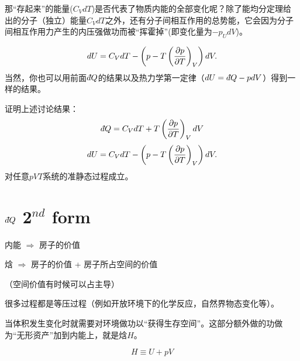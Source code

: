 \documentclass[CJK]{beamer}
\begin{document}
\begin{frame}
\bchL
那“存起来”的能量($C_VdT$)是否代表了物质内能的全部变化呢？除了能均分定理给出的分子（独立）能量$C_V dT$之外，还有分子间相互作用的总势能，它会因为分子间相互作用力产生的内压强做功而被“挥霍掉”(即变化量为$-p_U dV$)。

{\blue $$ dU = C_V dT - \left(p - T\left(\frac{\partial p}{\partial T}\right)_{V}\right) dV. $$}
当然，你也可以用前面$\dbar Q$的结果以及热力学第一定律（$dU = \dbar Q-pdV$）得到一样的结果。
\echL
\end{frame}



\begin{frame}
\bchL


证明上述讨论结果：
{\blue $$ \dbar Q = C_V dT + T\pfrac pTV dV $$}
{\blue $$ dU = C_V dT  - \left(p - T\left(\frac{\partial p}{\partial T}\right)_{V} \right) dV. $$}
对任意$pVT$系统的准静态过程成立。

\echL
\end{frame}


\section{$\dbar Q$ 2$^{nd}$ form}


\begin{frame}
\bchL

内能 $\Rightarrow$ 房子的价值

\skipline

焓 $\Rightarrow$ 房子的价值 + 房子所占空间的价值



（空间价值有时候可以占主导）


\echL
\end{frame}

\begin{frame}
\bchL
很多过程都是等压过程（例如开放环境下的化学反应，自然界物态变化等）。

\hspace{0.1in}

当体积发生变化时就需要对环境做功以“获得生存空间”。这部分额外做的功做为“无形资产”加到内能上，就是焓$H$。

$$ H  \equiv U + pV$$ 

\echL
\end{frame}
\end{document}
